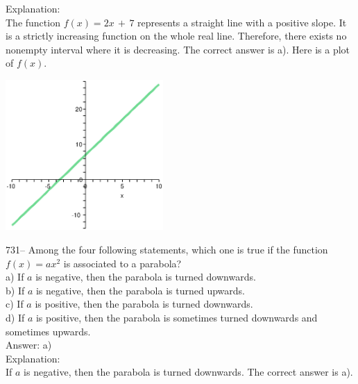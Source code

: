 \documentclass[letterpaper, 12pt]{article}
\begin{document}
Explanation: \\
The function $f(x)=2x\,+\,7$ represents a straight line with a positive slope. It is a strictly increasing function on the whole real line.
Therefore, there exists no nonempty interval where it is decreasing. The correct answer is a).
Here is a plot of $f(x)$.\\
    \begin{center}
    \includegraphics[width=6cm,bb=0 0 400 400]{fonction26.eps}
    \end{center}

731-- Among the four following statements, which one is true if the function $f(x)=ax^{2}$ is associated to a parabola?\\

a) If $a$ is negative, then the parabola is turned downwards.\\
b) If $a$ is negative, then the parabola is turned upwards.  \\
c) If $a$ is positive, then the parabola is turned downwards.\\
d) If $a$ is positive, then the parabola is sometimes turned downwards and sometimes upwards.\\

Answer: a)\\

Explanation: \\
If $a$ is negative, then the parabola is turned downwards. The correct answer is a).\\
\end{document}
